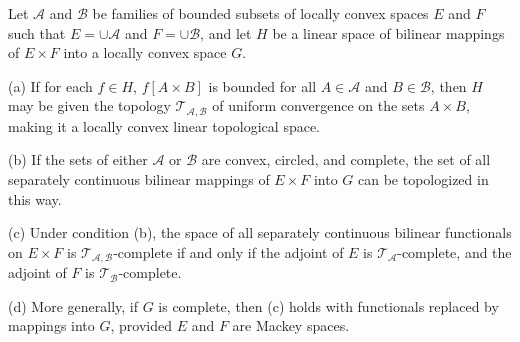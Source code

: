 Let $\mathcal{A}$ and $\mathcal{B}$ be families of bounded subsets of locally convex spaces $E$ and $F$ such that $E = \cup \mathcal{A}$ and $F = \cup \mathcal{B}$, and let $H$ be a linear space of bilinear mappings of $E \times F$ into a locally convex space $G$.

(a) If for each $f \in H$, $f[A \times B]$ is bounded for all $A \in \mathcal{A}$ and $B \in \mathcal{B}$, then $H$ may be given the topology $\mathcal{T}_{\mathcal{A},\mathcal{B}}$ of uniform convergence on the sets $A \times B$, making it a locally convex linear topological space.

(b) If the sets of either $\mathcal{A}$ or $\mathcal{B}$ are convex, circled, and complete, the set of all separately continuous bilinear mappings of $E \times F$ into $G$ can be topologized in this way.

(c) Under condition (b), the space of all separately continuous bilinear functionals on $E \times F$ is $\mathcal{T}_{\mathcal{A},\mathcal{B}}$-complete if and only if the adjoint of $E$ is $\mathcal{T}_{\mathcal{A}}$-complete, and the adjoint of $F$ is $\mathcal{T}_{\mathcal{B}}$-complete.

(d) More generally, if $G$ is complete, then (c) holds with functionals replaced by mappings into $G$, provided $E$ and $F$ are Mackey spaces.
